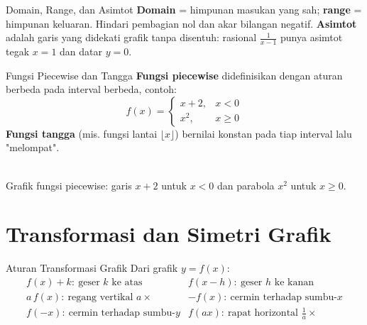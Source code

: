 \documentclass[11pt,a4paper]{report}
\theoremstyle{gaya}
\begin{document}
\begin{konsep}{Domain, Range, dan Asimtot}
\textbf{Domain} = himpunan masukan yang sah; \textbf{range} = himpunan keluaran. Hindari pembagian nol dan akar bilangan negatif. \textbf{Asimtot} adalah garis yang didekati grafik tanpa disentuh: rasional $\tfrac{1}{x-1}$ punya asimtot tegak $x=1$ dan datar $y=0$.
\end{konsep}

\begin{konsep}{Fungsi Piecewise dan Tangga}
\textbf{Fungsi piecewise} didefinisikan dengan aturan berbeda pada interval berbeda, contoh:
\[
f(x) = \begin{cases} x+2, & x < 0\\ x^2, & x \ge 0 \end{cases}
\]
\textbf{Fungsi tangga} (mis. fungsi lantai $\lfloor x \rfloor$) bernilai konstan pada tiap interval lalu "melompat".
\end{konsep}

\begin{center}
\\
\small Grafik fungsi piecewise: garis $x+2$ untuk $x<0$ dan parabola $x^2$ untuk $x\ge0$.
\end{center}

\section{Transformasi dan Simetri Grafik}
\begin{konsep}{Aturan Transformasi Grafik}
Dari grafik $y=f(x)$:
\[
\begin{array}{ll}
f(x)+k:\ \text{geser } k \text{ ke atas} & f(x-h):\ \text{geser } h \text{ ke kanan}\\
a\,f(x):\ \text{regang vertikal } a\times & -f(x):\ \text{cermin terhadap sumbu-}x\\
f(-x):\ \text{cermin terhadap sumbu-}y & f(ax):\ \text{rapat horizontal } \tfrac1a\times
\end{array}
\]
\end{konsep}
\end{document}
